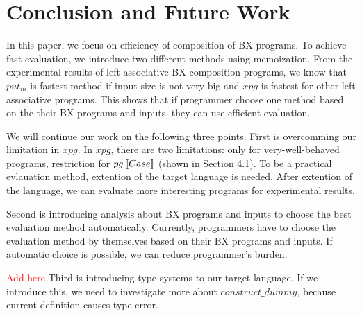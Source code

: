 \section{Conclusion and Future Work}

In this paper, we focus on efficiency of composition of BX programs.
To achieve fast evaluation, we introduce two different methods using memoization.
From the experimental results of left associative BX composition programs, we know that $put_m$ is fastest method if input size is not very big and $xpg$ is fastest for other left associative programs.
This shows that if programmer choose one method based on the their BX programs and inputs, they can use efficient evaluation. 


We will continue our work on the following three points.
First is overcomming our limitation in $xpg$. In $xpg$, there are two limitations: only for very-well-behaved programs, restriction for $pg \, [\![Case]\!]$ (shown in Section 4.1). To be a practical evlauation method, extention of the target language is needed. After extention of the language, we can evaluate more interesting programs for experimental results.

Second is introducing analysis about BX programs and inputs to choose the best evaluation method automatically.
Currently, programmers have to choose the evaluation method by themselves based on their BX programs and inputs. If automatic choice is possible, we can reduce programmer's burden.

\textcolor{red}{Add here}
Third is introducing type systems to our target language. If we introduce this, we need to investigate more about $construct\_dummy$, because current definition causes type error.









